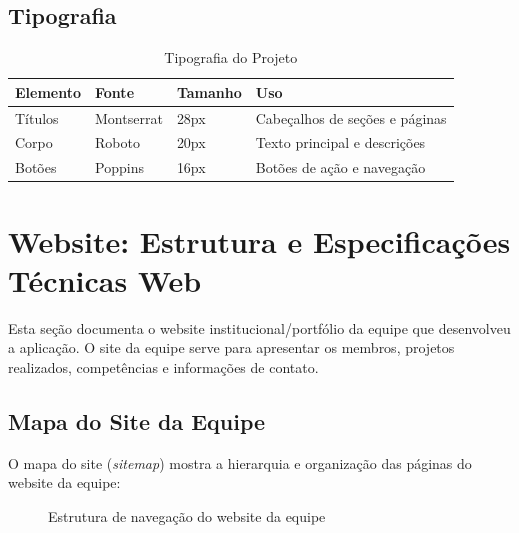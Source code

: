 \documentclass[11pt,a4paper]{article}
\begin{document}
\subsection{Tipografia}

\begin{table}[H]
\centering
\caption{Tipografia do Projeto}
\label{tab:tipografia}
\begin{tabular}{|l|l|l|l|}
\hline
\textbf{Elemento} & \textbf{Fonte} & \textbf{Tamanho} & \textbf{Uso} \\
\hline
Títulos & Montserrat & 28px & Cabeçalhos de seções e páginas \\
Corpo & Roboto & 20px & Texto principal e descrições \\
Botões & Poppins & 16px & Botões de ação e navegação \\
\hline
\end{tabular}
\end{table}

\section{Website: Estrutura e Especificações Técnicas Web}

Esta seção documenta o website institucional/portfólio da equipe que desenvolveu a aplicação. O site da equipe serve para apresentar os membros, projetos realizados, competências e informações de contato.

\subsection{Mapa do Site da Equipe}

O mapa do site (\textit{sitemap}) mostra a hierarquia e organização das páginas do website da equipe:

\begin{figure}[H]
\centering
{}
\caption{Estrutura de navegação do website da equipe}
\label{fig:sitemap}
\end{figure}
\end{document}
